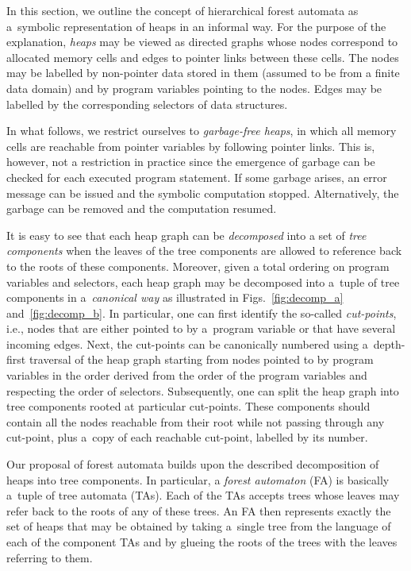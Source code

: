 In this section, we outline the concept of hierarchical
forest automata as a~symbolic representation of heaps in an informal way. For
the purpose of the explanation, \emph{heaps} may be viewed as directed graphs
whose nodes correspond to allocated memory cells and edges to pointer links
between these cells. The nodes may be labelled by non-pointer data stored in
them (assumed to be from a finite data domain) and by program variables pointing
to the nodes. Edges may be labelled by the corresponding selectors of data
structures.

In what follows, we restrict ourselves to \emph{garbage-free heaps}, in which all
memory cells are reachable from pointer variables by following pointer links.
This is, however, not a restriction in practice since the emergence of garbage
can be checked for each executed program statement. If some garbage arises, an
error message can be issued and the symbolic computation stopped. Alternatively, the
garbage can be removed and the computation resumed.

It is easy to see that each heap graph can be \emph{decomposed} into a set of
\emph{tree components} when the leaves of the tree components are allowed to
reference back to the roots of these components. Moreover, given a total
ordering on program variables and selectors, each heap graph may be decomposed
into a~tuple of tree components in a~\emph{canonical way} as illustrated in
Figs.~\ref{fig:decomp_a} and~\ref{fig:decomp_b}. In particular, one can first identify
the so-called \emph{cut-points}, i.e., nodes that are either pointed to by
a~program variable or that have several incoming edges. Next, the cut-points can
be canonically numbered using a~depth-first traversal of the heap graph starting
from nodes pointed to by program variables in the order derived from the order
of the program variables and respecting the order of selectors. Subsequently,
one can split the heap graph into tree components rooted at particular
cut-points. These components should contain all the nodes reachable from their
root while not passing through any cut-point, plus a~copy of each reachable
cut-point, labelled by its number. 

Our proposal of forest automata builds upon the described decomposition of heaps
into tree components. In particular, a \emph{forest automaton} (FA) is basically
a~tuple of tree automata (TAs). Each of the TAs accepts trees whose
leaves may refer back to the roots of any of these trees. An FA then represents
exactly the set of heaps that may be obtained by taking a~single tree from the
language of each of the component TAs and by glueing the roots of the trees with
the leaves referring to them.

